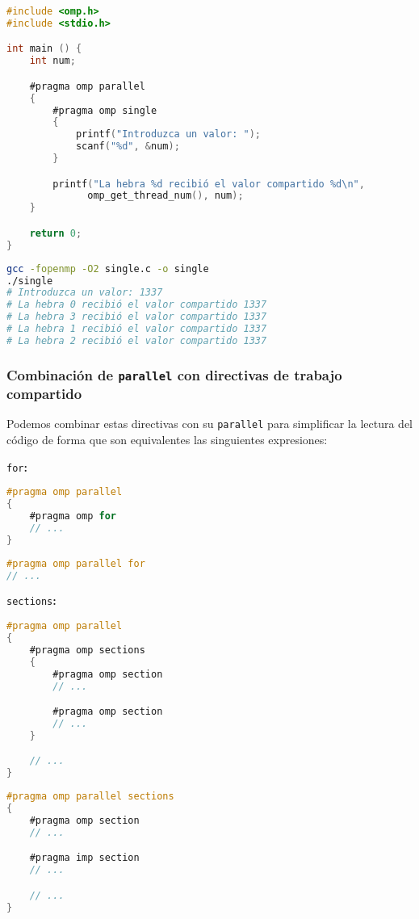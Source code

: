 \begin{lstlisting}[language=C]
#include <omp.h>
#include <stdio.h>

int main () {
	int num;

	#pragma omp parallel
	{
		#pragma omp single
		{
			printf("Introduzca un valor: ");
			scanf("%d", &num);
		}

		printf("La hebra %d recibió el valor compartido %d\n",
	          omp_get_thread_num(), num);
	}

	return 0;
}
\end{lstlisting}

\begin{lstlisting}[language=sh]
gcc -fopenmp -O2 single.c -o single
./single
# Introduzca un valor: 1337
# La hebra 0 recibió el valor compartido 1337
# La hebra 3 recibió el valor compartido 1337
# La hebra 1 recibió el valor compartido 1337
# La hebra 2 recibió el valor compartido 1337
\end{lstlisting}

\subsubsection{Combinación de \texttt{parallel} con directivas de trabajo compartido}

Podemos combinar estas directivas con su \texttt{parallel} para simplificar la lectura del código de forma que son equivalentes las singuientes expresiones:

\texttt{for}\textbf{:}

\begin{lstlisting}[language=C]
#pragma omp parallel
{
	#pragma omp for
	// ...
}
\end{lstlisting}

\begin{lstlisting}[language=C]
#pragma omp parallel for
// ...
\end{lstlisting}

\texttt{sections}\textbf{:}

\begin{lstlisting}[language=C]
#pragma omp parallel
{
	#pragma omp sections
	{
		#pragma omp section
		// ...

		#pragma omp section
		// ...
	}

	// ...
}
\end{lstlisting}

\begin{lstlisting}[language=C]
#pragma omp parallel sections
{
	#pragma omp section
	// ...

	#pragma imp section
	// ...

	// ...
}
\end{lstlisting}

